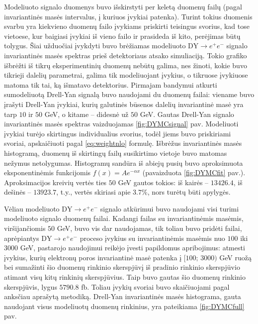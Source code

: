 \documentclass[a4paper, 12pt]{article}
\newlength\q
\begin{document}
Modeliuoto signalo duomenys buvo išskirstyti per keletą duomenų failų (pagal invariantinės masės intervalus, į kuriuos įvykiai patenka). Turint tokius duomenis svarbu yra kiekvieno duomenų failo įvykiams priskirti teisingus svorius, kad tose vietoese, kur baigiasi įvykiai iš vieno failo ir prasideda iš kito, perėjimas būtų tolygus. Šiai užduočiai įvykdyti buvo brėžiamas modeliuoto $\mathrm{DY} \! \rightarrow \! e^{+}e^{-}$ signalo invariantinės masės spektras prieš detektoriaus atsako simuliaciją. Tokio grafiko išbrėžti iš tikrų eksperimentinių duomenų nebūtų galima, nes žinoti, kokie buvo tikrieji dalelių parametrai, galima tik modeliuojant įvykius, o tikruose įvykiuose matoma tik tai, ką išmatavo detektorius. Pirmajam bandymui atkurti sumodeliuotą Drell-Yan signalą buvo naudojami du duomenų failai: viename buvo įrašyti Drell-Yan įvykiai, kurių galutinės būsenos dalelių invariantinė masė yra tarp $10$ ir $50$ GeV, o kitame -- didesnė už $50$ GeV. Gautas Drell-Yan signalo invariantinės masės spektras vaizduojamas \ref{fig:DYMCsignal} pav. Modeliuoti įvykiai turėjo skirtingus individualius svorius, todėl jiems buvo priskiriami svoriai, apskaičiuoti pagal \eqref{eq:weightnlo} formulę. Išbrėžus invariantinės masės histogramą, duomenų iš skirtingų failų susikirtimo vietoje buvo matomas nežymus netolygumas. Histogramų sandūra iš abiejų pusių buvo aproksimuota eksponentinėmis funkcijomis $f(x)=Ae^{-\alpha x}$ (pavaizduota \ref{fig:DYMCfit} pav.). Aproksimacijos kreivių vertės ties $50$ GeV gautos tokios: iš kairės -- $13426.4$, iš dešinės -- $13923.7$, t.y.,  vertės skiriasi apie $3.7\%$, nors turėtų būti apylygės.

Vėliau modeliuoto $\mathrm{DY} \! \rightarrow \! e^{+}e^{-}$ signalo atkūrimui buvo naudojami visi turimi modeliuoto signalo duomenų failai. Kadangi failas su invariantinėmis masėmis, viršijančiomis $50$ GeV, buvo vis dar naudojamas, tik toliau buvo pridėti failai, aprėpiantys $\mathrm{DY} \! \rightarrow \! e^{+}e^{-}$ proceso įvykius su invariantinėmis masėmis nuo $100$ iki $3000$ GeV, pastarojo naudojimui reikėjo įvesti papildomus apribojimus: atmesti įvykius, kurių elektronų poros invariantinė masė patenka į $[100; \, 3000)$ GeV ruožą bei sumažinti šio duomenų rinkinio skerspjūvį iš pradinio rinkinio skerspjūvio atimant visų kitų rinkinių skerspjūvius. Taip buvo gautas šio duomenų rinkinio skerspjūvis, lygus $5790.8$ fb. Toliau įvykių svoriai buvo skaičiuojami pagal anksčiau aprašytą metodiką. Drell-Yan invariantinės masės histograma, gauta naudojant visus modeliuotų duomenų rinkinius, yra pateikiama \ref{fig:DYMCfull} pav.
\end{document}
